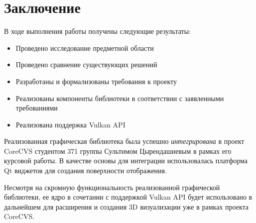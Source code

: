\documentclass[14pt]{matmex-diploma}
\begin{document}

\section*{Заключение}

В ходе выполнения работы получены следующие результаты:

\begin{itemize}
    \item Проведено исследование предметной области
    \item Проведено сравнение существующих решений
    \item Разработаны и формализованы требования к проекту
    \item Реализованы компоненты библиотеки в соответствии с заявленными требованиями
    \item Реализована поддержка Vulkan API
\end{itemize}

Реализованная графическая библиотека была успешно \textit{интегрирована} в проект CoreCVS студентом 371 группы Сультимом Цырендашиевым в рамках его курсовой работы. В качестве основы для интеграции использовалась платформа Qt виджетов для создания поверхности отображения. 

Несмотря на скромную функциональность реализованной графической библиотеки, ее ядро в сочетании с поддержкой Vulkan API будет использовано в дальнейшем для расширения и создания 3D визуализации уже в рамках проекта CoreCVS.


\setmonofont[Mapping=tex-text]{CMU Typewriter Text}


\end{document}
